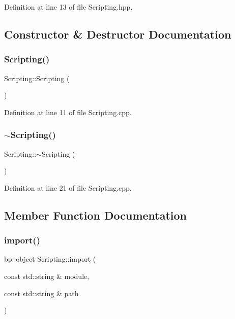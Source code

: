 Definition at line 13 of file Scripting.\+hpp.



\subsection{Constructor \& Destructor Documentation}
\mbox{\label{class_scripting_ab978243f5f2fd597651d6c4c28cb83ca}} 
\subsubsection{\texorpdfstring{Scripting()}{Scripting()}}
{\footnotesize\ttfamily Scripting\+::\+Scripting (\begin{DoxyParamCaption}{ }\end{DoxyParamCaption})}



Definition at line 11 of file Scripting.\+cpp.

\mbox{\label{class_scripting_a86954eb45e89b43ffd7b58dbec15e646}} 
\subsubsection{\texorpdfstring{$\sim$Scripting()}{~Scripting()}}
{\footnotesize\ttfamily Scripting\+::$\sim$\+Scripting (\begin{DoxyParamCaption}{ }\end{DoxyParamCaption})}



Definition at line 21 of file Scripting.\+cpp.



\subsection{Member Function Documentation}
\mbox{\label{class_scripting_a3577d49cf19217ce37230e7f39ed644a}} 
\subsubsection{\texorpdfstring{import()}{import()}}
{\footnotesize\ttfamily bp\+::object Scripting\+::import (\begin{DoxyParamCaption}\item[{const std\+::string \&}]{module,  }\item[{const std\+::string \&}]{path }\end{DoxyParamCaption})}




